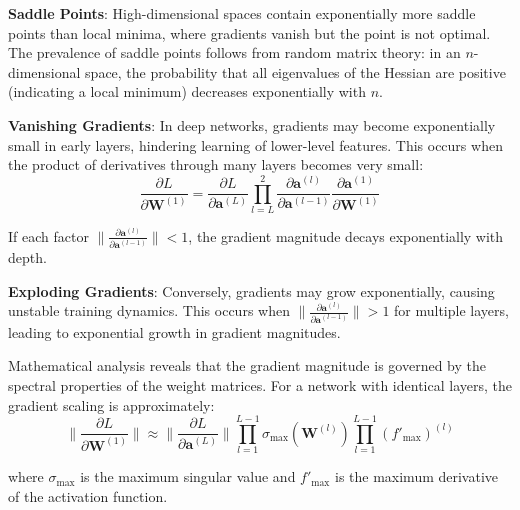 \documentclass[11pt,a4paper]{report}
\begin{document}
\textbf{Saddle Points}: High-dimensional spaces contain exponentially more saddle points than local minima, where gradients vanish but the point is not optimal. The prevalence of saddle points follows from random matrix theory: in an $n$-dimensional space, the probability that all eigenvalues of the Hessian are positive (indicating a local minimum) decreases exponentially with $n$.

\textbf{Vanishing Gradients}: In deep networks, gradients may become exponentially small in early layers, hindering learning of lower-level features. This occurs when the product of derivatives through many layers becomes very small:
\begin{equation}
\frac{\partial L}{\partial \mathbf{W}^{(1)}} = \frac{\partial L}{\partial \mathbf{a}^{(L)}} \prod_{l=L}^{2} \frac{\partial \mathbf{a}^{(l)}}{\partial \mathbf{a}^{(l-1)}} \frac{\partial \mathbf{a}^{(1)}}{\partial \mathbf{W}^{(1)}}
\end{equation}

If each factor $\|\frac{\partial \mathbf{a}^{(l)}}{\partial \mathbf{a}^{(l-1)}}\| < 1$, the gradient magnitude decays exponentially with depth.

\textbf{Exploding Gradients}: Conversely, gradients may grow exponentially, causing unstable training dynamics. This occurs when $\|\frac{\partial \mathbf{a}^{(l)}}{\partial \mathbf{a}^{(l-1)}}\| > 1$ for multiple layers, leading to exponential growth in gradient magnitudes.

Mathematical analysis reveals that the gradient magnitude is governed by the spectral properties of the weight matrices. For a network with identical layers, the gradient scaling is approximately:
\begin{equation}
\|\frac{\partial L}{\partial \mathbf{W}^{(1)}}\| \approx \|\frac{\partial L}{\partial \mathbf{a}^{(L)}}\| \prod_{l=1}^{L-1} \sigma_{\max}(\mathbf{W}^{(l)}) \prod_{l=1}^{L-1} \left(f'_{\max}\right)^{(l)}
\end{equation}

where $\sigma_{\max}$ is the maximum singular value and $f'_{\max}$ is the maximum derivative of the activation function.
\end{document}
